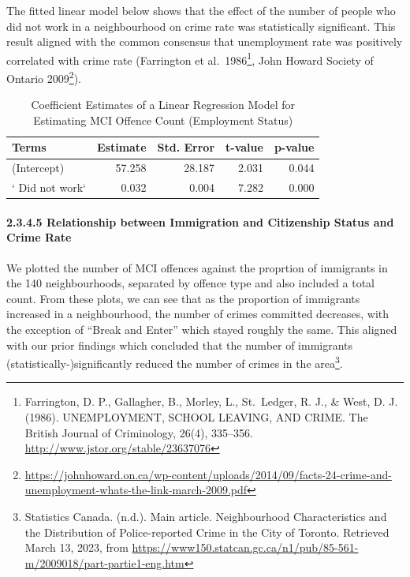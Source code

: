 \documentclass[
]{article}
\begin{document}
The fitted linear model below shows that the effect of the number of
people who did not work in a neighbourhood on crime rate was
statistically significant. This result aligned with the common consensus
that unemployment rate was positively correlated with crime rate
(Farrington et al.~1986\footnote{Farrington, D. P., Gallagher, B.,
  Morley, L., St.~Ledger, R. J., \& West, D. J. (1986). UNEMPLOYMENT,
  SCHOOL LEAVING, AND CRIME. The British Journal of Criminology, 26(4),
  335--356. \url{http://www.jstor.org/stable/23637076}}, John Howard
Society of Ontario 2009\footnote{\url{https://johnhoward.on.ca/wp-content/uploads/2014/09/facts-24-crime-and-unemployment-whats-the-link-march-2009.pdf}}).

\begin{table}

\caption{\label{tab:crime-vs-employment-lm}Coefficient Estimates of a Linear Regression Model for Estimating MCI Offence Count (Employment Status)}
\centering
\begin{tabular}[t]{l|r|r|r|r}
\hline
Terms & Estimate & Std. Error & t-value & p-value\\
\hline
(Intercept) & 57.258 & 28.187 & 2.031 & 0.044\\
\hline
`  Did not work` & 0.032 & 0.004 & 7.282 & 0.000\\
\hline
\end{tabular}
\end{table}

\hypertarget{relationship-between-immigration-and-citizenship-status-and-crime-rate}{%
\paragraph{2.3.4.5 Relationship between Immigration and Citizenship
Status and Crime
Rate}\label{relationship-between-immigration-and-citizenship-status-and-crime-rate}}

We plotted the number of MCI offences against the proprtion of
immigrants in the 140 neighbourhoods, separated by offence type and also
included a total count. From these plots, we can see that as the
proportion of immigrants increased in a neighbourhood, the number of
crimes committed decreases, with the exception of ``Break and Enter''
which stayed roughly the same. This aligned with our prior findings
which concluded that the number of immigrants
(statistically-)significantly reduced the number of crimes in the
area\footnote{Statistics Canada. (n.d.). Main article. Neighbourhood
  Characteristics and the Distribution of Police-reported Crime in the
  City of Toronto. Retrieved March 13, 2023, from
  \url{https://www150.statcan.gc.ca/n1/pub/85-561-m/2009018/part-partie1-eng.htm}}.
\end{document}
